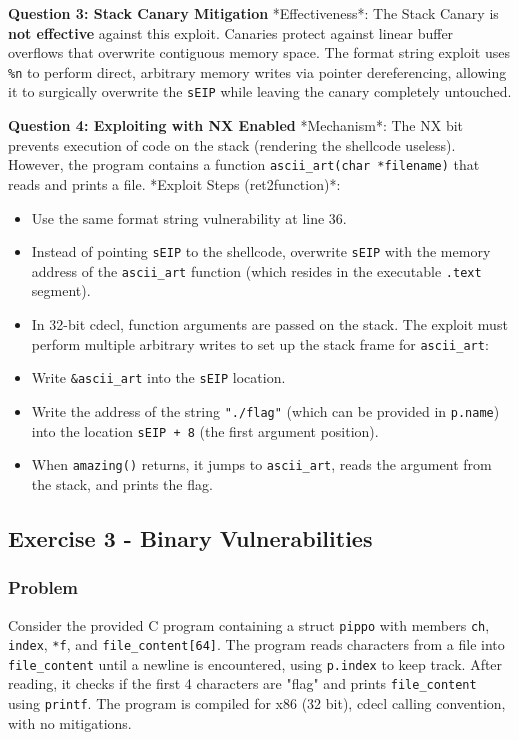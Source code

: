 \documentclass{article}
\begin{document}
\textbf{Question 3: Stack Canary Mitigation}
*Effectiveness*: The Stack Canary is \textbf{not effective} against this exploit. Canaries protect against linear buffer overflows that overwrite contiguous memory space. The format string exploit uses \texttt{\%n} to perform direct, arbitrary memory writes via pointer dereferencing, allowing it to surgically overwrite the \texttt{sEIP} while leaving the canary completely untouched.

\textbf{Question 4: Exploiting with NX Enabled}
*Mechanism*: The NX bit prevents execution of code on the stack (rendering the shellcode useless). However, the program contains a function \texttt{ascii\_art(char *filename)} that reads and prints a file.
*Exploit Steps (ret2function)*:
\begin{itemize}
    \item[\textbf{1.}] Use the same format string vulnerability at line 36.
    \item[\textbf{2.}] Instead of pointing \texttt{sEIP} to the shellcode, overwrite \texttt{sEIP} with the memory address of the \texttt{ascii\_art} function (which resides in the executable \texttt{.text} segment).
    \item[\textbf{3.}] In 32-bit cdecl, function arguments are passed on the stack. The exploit must perform multiple arbitrary writes to set up the stack frame for \texttt{ascii\_art}:
    \item Write \texttt{\&ascii\_art} into the \texttt{sEIP} location.
    \item Write the address of the string \texttt{"./flag"} (which can be provided in \texttt{p.name}) into the location \texttt{sEIP + 8} (the first argument position).
    \item[\textbf{4.}] When \texttt{amazing()} returns, it jumps to \texttt{ascii\_art}, reads the argument from the stack, and prints the flag.
\end{itemize}

\subsection{Exercise 3 - Binary Vulnerabilities}
\subsubsection*{Problem}
Consider the provided C program containing a struct \texttt{pippo} with members \texttt{ch}, \texttt{index}, \texttt{*f}, and \texttt{file\_content[64]}. The program reads characters from a file into \texttt{file\_content} until a newline is encountered, using \texttt{p.index} to keep track. After reading, it checks if the first 4 characters are "flag" and prints \texttt{file\_content} using \texttt{printf}.
The program is compiled for x86 (32 bit), cdecl calling convention, with no mitigations.
\end{document}
